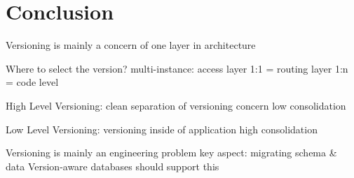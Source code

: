 \section{Conclusion}

Versioning is mainly a concern of one layer in architecture

Where to select the version?
multi-instance: access layer
1:1 = routing layer
1:n = code level

High Level Versioning:
clean separation of versioning concern
low consolidation

Low Level Versioning:
versioning inside of application
high consolidation

Versioning is mainly an engineering problem
key aspect: migrating schema \& data
Version-aware databases should support this

